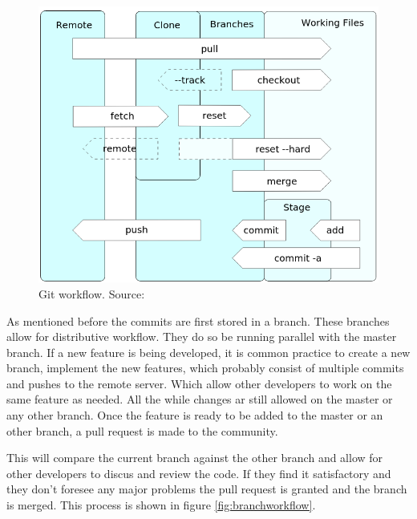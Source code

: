 \documentclass[fleqn,10pt]{SelfArx} %
\begin{document}
\begin{figure}[t]
	\includegraphics[width=\textwidth/2]{../images/githubworkflow1.png}
	\caption{Git workflow. Source: \citeauthor{_git_2015} \cite{_git_2015}}\label{fig:gitworkflow}
\end{figure}

As mentioned before the commits are first stored in a branch. These branches allow for distributive workflow. They do so be running parallel with the master branch. If a new feature is being developed, it is common practice to create a new branch, implement the new features, which probably consist of multiple commits and pushes to the remote server. Which allow other developers to work on the same feature as needed. All the while changes ar still allowed on the master or any other branch. Once the feature is ready to be added to the master or an other branch, a pull request is made to the community.

This will compare the current branch against the other branch and allow for other developers to discus and review the code. If they find it satisfactory and they don't foresee any major problems the pull request is granted and the branch is merged. This process is shown in figure \ref{fig:branchworkflow}.
\end{document}
